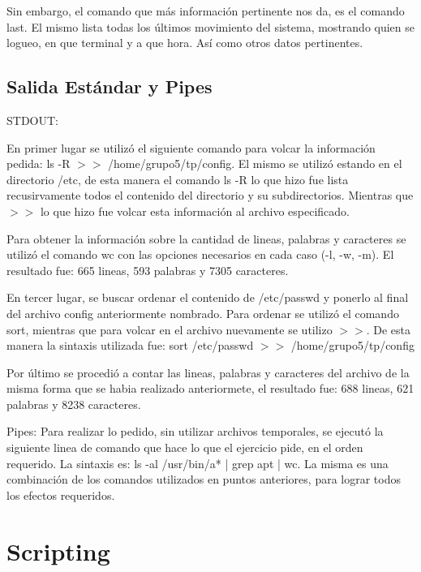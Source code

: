 \documentclass[a4paper, 12pt]{article}
\begin{document}
Sin embargo, el comando que m\'as informaci\'on pertinente nos da, es el comando last. El mismo lista todas los \'ultimos movimiento del sistema, mostrando quien se logueo, en que terminal y a que hora. As\'i como otros datos pertinentes.

\subsection*{Salida Est\'andar y Pipes}

STDOUT:

En primer lugar se utiliz\'o el siguiente comando para volcar la informaci\'on pedida: ls -R $>>$ /home/grupo5/tp/config. El mismo se utiliz\'o estando en el directorio /etc, de esta manera el comando ls -R lo que hizo fue lista recusirvamente todos el contenido del directorio y su subdirectorios. Mientras que $>>$ lo que hizo fue volcar esta informaci\'on al archivo especificado.

Para obtener la informaci\'on sobre la cantidad de lineas, palabras y caracteres se utiliz\'o el comando wc con las opciones necesarios en cada caso (-l, -w, -m). El resultado fue: 665 lineas, 593 palabras y 7305 caracteres.

En tercer lugar, se buscar ordenar el contenido de /etc/passwd y ponerlo al final del archivo config anteriormente nombrado. Para ordenar se utiliz\'o el comando sort, mientras que para volcar en el archivo nuevamente se utilizo $>>$. De esta manera la sintaxis utilizada fue: sort /etc/passwd $>>$ /home/grupo5/tp/config

Por \'ultimo se procedi\'o a contar las lineas, palabras y caracteres del archivo de la misma forma que se habia realizado anteriormete, el resultado fue: 688 lineas, 621 palabras y 8238 caracteres.

\medskip


Pipes: Para realizar lo pedido, sin utilizar archivos temporales, se ejecut\'o la siguiente linea de comando que hace lo que el ejercicio pide, en el orden requerido. La sintaxis es: ls -al /usr/bin/a* | grep apt | wc. La misma es una combinaci\'on de los comandos utilizados en puntos anteriores, para lograr todos los efectos requeridos.



\section*{Scripting}
\end{document}
